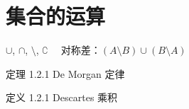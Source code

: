 \section{集合的运算}


$\cup$, $\cap$, $\setminus$, $\complement \quad$ 对称差：$(A \setminus B) \cup (B \setminus A)$

定理 1.2.1 \quad De Morgan 定律

定义 1.2.1 \quad Descartes 乘积